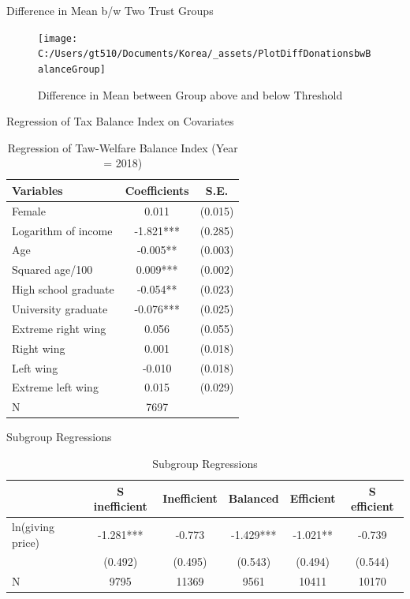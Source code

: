 \documentclass[
  ignorenonframetext,
]{beamer}
\begin{document}
\begin{frame}{Difference in Mean b/w Two Trust Groups}
\protect\hypertarget{difference-in-mean-bw-two-trust-groups-1}{}

\begin{figure}
\texttt{[image: C:/Users/gt510/Documents/Korea/\_assets/PlotDiffDonationsbwBalanceGroup]} \caption{Difference in Mean between Group above and below Threshold}\label{fig:unnamed-chunk-10}
\end{figure}

\end{frame}

\begin{frame}{Regression of Tax Balance Index on Covariates}
\protect\hypertarget{regression-of-tax-balance-index-on-covariates}{}

\begin{table}

\caption{\label{tab:kableRegBalanceidOnCovariate}Regression of Taw-Welfare Balance Index (Year = 2018)}
\centering
\begin{tabular}[t]{lcc}
\toprule
Variables & Coefficients & S.E.\\
\midrule
Female & 0.011 & (0.015)\\
Logarithm of income & -1.821*** & (0.285)\\
Age & -0.005** & (0.003)\\
Squared age/100 & 0.009*** & (0.002)\\
High school graduate & -0.054** & (0.023)\\
University graduate & -0.076*** & (0.025)\\
Extreme right wing & 0.056 & (0.055)\\
Right wing & 0.001 & (0.018)\\
Left wing & -0.010 & (0.018)\\
Extreme left wing & 0.015 & (0.029)\\
N & 7697 & \\
\bottomrule
\end{tabular}
\end{table}

\end{frame}

\begin{frame}{Subgroup Regressions}
\protect\hypertarget{subgroup-regressions-1}{}

\begin{table}

\caption{\label{tab:kableEstimateElasticityByBalanceGroup}Subgroup Regressions}
\centering
\fontsize{8}{10}\selectfont
\begin{tabular}[t]{lccccc}
\toprule
 & S inefficient & Inefficient & Balanced & Efficient & S efficient\\
\midrule
ln(giving price) & -1.281*** & -0.773 & -1.429*** & -1.021** & -0.739\\
 & (0.492) & (0.495) & (0.543) & (0.494) & (0.544)\\
N & 9795 & 11369 & 9561 & 10411 & 10170\\
\bottomrule
\end{tabular}
\end{table}

\end{frame}
\end{document}
